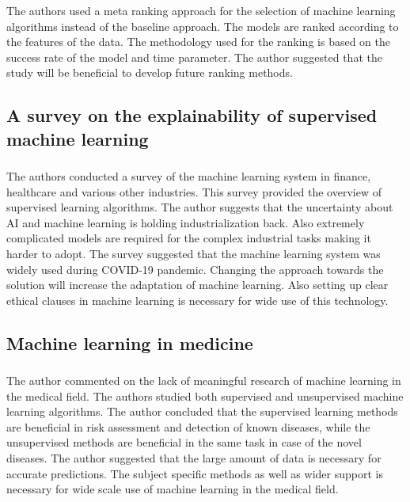 \subsubsection{\citeauthor*{ref_paper_23} \citeyearpar{ref_paper_23}}

The authors used a meta ranking approach for the selection of machine learning algorithms instead of the baseline approach. The models are ranked according to the features of the data. The methodology used for the ranking is based on the success rate of the model and time parameter. The author suggested that the study will be beneficial to develop future ranking methods.

\subsection{A survey on the explainability of supervised machine learning}
\subsubsection{\citeauthor*{ref_paper_14} \citeyearpar{ref_paper_14}}

The authors conducted a survey of the machine learning system in finance, healthcare and various other industries. This survey provided the overview of supervised learning algorithms. The author suggests that the uncertainty about AI and machine learning is holding industrialization back. Also extremely complicated models are required for the complex industrial tasks making it harder to adopt. The survey suggested that the machine learning system was widely used during COVID-19 pandemic. Changing the approach towards the solution will increase the adaptation of machine learning. Also setting up clear ethical clauses in machine learning is necessary for wide use of this technology.

\subsection{Machine learning in medicine}
\subsubsection{\citeauthor*{ref_paper_24} \citeyearpar{ref_paper_24}}

The author commented on the lack of meaningful research of machine learning in the medical field. The authors studied both supervised and unsupervised machine learning algorithms. The author concluded that the supervised learning methods are beneficial in risk assessment and detection of known diseases, while the unsupervised methods are beneficial in the same task in case of the novel diseases. The author suggested that the large amount of data is necessary for accurate predictions. The subject specific methods as well as wider support is necessary for wide scale use of machine learning in the medical field.

